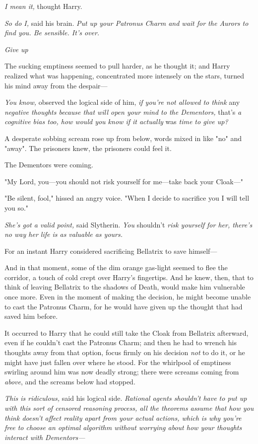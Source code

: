 \emph{I mean it,} thought Harry.

\emph{So do I,} said his brain. \emph{Put up your Patronus Charm and wait for
the Aurors to find you. Be sensible. It's over.}

\emph{Give up{\el}}

The sucking emptiness seemed to pull harder, as he thought it; and Harry
realized what was happening, concentrated more intensely on the stars, turned
his mind away from the despair---

\emph{You know,} observed the logical side of him, \emph{if you're not allowed
to think} any \emph{negative thoughts because that will open your mind to the
Dementors,} that's \emph{a cognitive bias too, how would you know if it
actually} was \emph{time to give up?}

A desperate sobbing scream rose up from below, words mixed in like "no" and
"away". The prisoners knew, the prisoners could feel it.

The Dementors were coming.

"My Lord, you---you should not risk yourself for me---take back your Cloak\mbox{---}"

"Be silent, fool," hissed an angry voice. "When I decide to sacrifice you I
will tell you so."

\emph{She's got a valid point,} said Slytherin. \emph{You} shouldn't \emph{risk
yourself for her, there's no way her life is as valuable as yours.}

For an instant Harry considered sacrificing Bellatrix to save himself---

And in that moment, some of the dim orange gas-light seemed to flee the
corridor, a touch of cold crept over Harry's fingertips. And he knew, then,
that to think of leaving Bellatrix to the shadows of Death, would make him
vulnerable once more. Even in the moment of making the decision, he might
become unable to cast the Patronus Charm, for he would have given up the
thought that had saved him before.

It occurred to Harry that he could still take the Cloak from Bellatrix
afterward, even if he couldn't cast the Patronus Charm; and then he had to
wrench his thoughts away from that option, focus firmly on his decision
\emph{not} to do it, or he might have just fallen over where he stood. For the
whirlpool of emptiness swirling around him was now deadly strong; there were
screams coming from \emph{above}, and the screams below had stopped.

\emph{This is ridiculous,} said his logical side. \emph{Rational agents
shouldn't have to put up with this sort of censored reasoning process, all the
theorems assume that how you think doesn't affect reality apart from your
actual actions, which is why you're free to choose an optimal algorithm without
worrying about how your thoughts interact with Dementors---}

